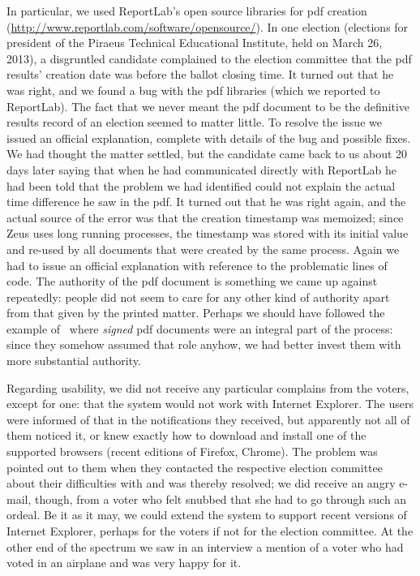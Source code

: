 \documentclass[letterpaper,10pt]{article}
\begin{document}
In particular, we used ReportLab's open source libraries for {\sc pdf}
creation (\url{http://www.reportlab.com/software/opensource/}). In one
election (elections for president of the Piraeus Technical Educational
Institute, held on March 26, 2013), a disgruntled candidate complained
to the election committee that the {\sc pdf} results' creation date
was before the ballot closing time. It turned out that he was right,
and we found a bug with the {\sc pdf} libraries (which we reported to
ReportLab). The fact that we never meant the {\sc pdf} document to be
the definitive results record of an election seemed to matter little.
To resolve the issue we issued an official explanation, complete with
details of the bug and possible fixes. We had thought the matter
settled, but the candidate came back to us about 20 days later saying
that when he had communicated directly with ReportLab he had been told
that the problem we had identified could not explain the actual time
difference he saw in the {\sc pdf}. It turned out that he was right
again, and the actual source of the error was that the creation
timestamp was memoized; since Zeus uses long running processes, the
timestamp was stored with its initial value and re-used by all
documents that were created by the same process. Again we had to issue
an official explanation with reference to the problematic lines of
code. The authority of the {\sc pdf} document is something we came up
against repeatedly: people did not seem to care for any other kind of
authority apart from that given by the printed matter. Perhaps we
should have followed the example of~\cite{adida:2009} where
\emph{signed} {\sc pdf} documents were an integral part of the
process: since they somehow assumed that role anyhow, we had better
invest them with more substantial authority.

Regarding usability, we did not receive any particular complains from
the voters, except for one: that the system would not work with
Internet Explorer. The users were informed of that in the
notifications they received, but apparently not all of them noticed
it, or knew exactly how to download and install one of the supported
browsers (recent editions of Firefox, Chrome). The problem was pointed
out to them when they contacted the respective election committee
about their difficulties with and was thereby resolved; we did receive
an angry e-mail, though, from a voter who felt snubbed that she had to
go through such an ordeal. Be it as it may, we could extend the system
to support recent versions of Internet Explorer, perhaps for the voters
if not for the election committee. At the other end of the spectrum we
saw in an interview a mention of a voter who had voted in an airplane
and was very happy for it.
\end{document}
